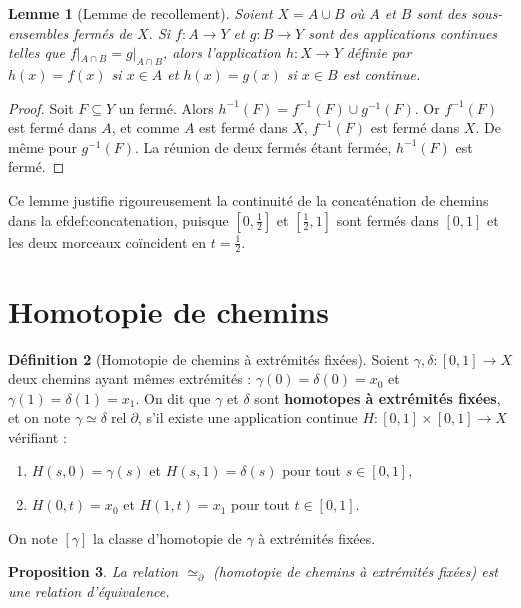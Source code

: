 \documentclass[12pt,a4paper,openany]{book}
\theoremstyle{definition}
\newtheorem{definition}{Définition}[chapter]
\theoremstyle{plain}
\newtheorem{proposition}[definition]{Proposition}
\newtheorem{lemme}[definition]{Lemme}
\theoremstyle{remark}
\newcommand{\rel}{\operatorname{rel}}
\begin{document}
\begin{lemme}[Lemme de recollement]\label{lem:recollement}
Soient $X = A \cup B$ où $A$ et $B$ sont des sous-ensembles fermés de $X$. Si
$f : A \to Y$ et $g : B \to Y$ sont des applications continues telles que
$f|_{A \cap B} = g|_{A \cap B}$, alors l'application $h : X \to Y$ définie par
$h(x) = f(x)$ si $x \in A$ et $h(x) = g(x)$ si $x \in B$ est continue.
\end{lemme}

\begin{proof}
Soit $F \subseteq Y$ un fermé. Alors
$h^{-1}(F) = f^{-1}(F) \cup g^{-1}(F)$. Or $f^{-1}(F)$ est fermé dans $A$, et
comme $A$ est fermé dans $X$, $f^{-1}(F)$ est fermé dans $X$. De même pour
$g^{-1}(F)$. La réunion de deux fermés étant fermée, $h^{-1}(F)$ est fermé.
\end{proof}

Ce lemme justifie rigoureusement la continuité de la concaténation de chemins
dans la 
ef{def:concatenation}, puisque $[0, \tfrac{1}{2}]$ et
$[\tfrac{1}{2}, 1]$ sont fermés dans $[0,1]$ et les deux morceaux coïncident en
$t = \tfrac{1}{2}$.

\section{Homotopie de chemins}\label{sec:homotopie-chemins}

\begin{definition}[Homotopie de chemins à extrémités fixées]\label{def:homotopie-chemins}
Soient $\gamma, \delta : [0,1] \to X$ deux chemins ayant mêmes extrémités :
$\gamma(0) = \delta(0) = x_0$ et $\gamma(1) = \delta(1) = x_1$. On dit que
$\gamma$ et $\delta$ sont \textbf{homotopes à extrémités fixées}, et on note
$\gamma \simeq \delta \rel \partial$, s'il existe une application continue
$H : [0,1] \times [0,1] \to X$ vérifiant :
\begin{enumerate}[label=(\roman*)]
\item $H(s, 0) = \gamma(s)$ et $H(s, 1) = \delta(s)$ pour tout $s \in [0,1]$,
\item $H(0, t) = x_0$ et $H(1, t) = x_1$ pour tout $t \in [0,1]$.
\end{enumerate}
On note $[\gamma]$ la classe d'homotopie de $\gamma$ à extrémités fixées.
\end{definition}

\begin{proposition}\label{prop:homotopie-chemins-equiv}
La relation $\simeq_{\partial}$ (homotopie de chemins à extrémités fixées) est
une relation d'équivalence.
\end{proposition}
\end{document}
